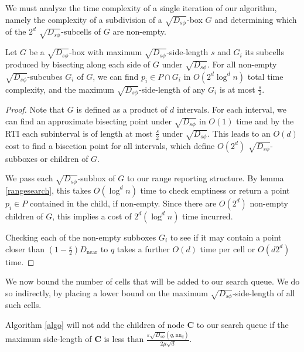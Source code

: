 \documentclass[11pt]{myclass}
\newcommand{\sbreg}{\ensuremath{D_{s\phi}}}
\newcommand{\eps}{\varepsilon}
\begin{document}
We must analyze the time complexity of a single iteration of our algorithm, namely the complexity of a subdivision of a $\sqrt{\sbreg}$-box $G$ and determining which of the $2^d$ $\sqrt{\sbreg}$-subcells of $G$ are non-empty.
\begin{lemma}\label{bisectionProcedure}
Let $G$ be a $\sqrt{\sbreg}$-box with maximum $\sqrt{\sbreg}$-side-length $s$ and $G_i$ its subcells produced by bisecting along each side of $G$ under $\sqrt{\sbreg}$. For all non-empty $\sqrt{\sbreg}$-subcubes $G_i$ of $G$, we can find $p_i \in P \cap G_i$ in $O(2^d \log^{d} n)$ total time complexity, and the maximum $\sqrt{\sbreg}$-side-length of any $G_i$ is at most $\frac{s}{2}$.
\end{lemma}

\begin{proof}
 Note that $G$ is defined as a product of $d$ intervals. For each interval, we can find an approximate bisecting point under
$\sqrt{\sbreg}$ in $O(1)$ time and by the RTI each subinterval is of length at most $\frac{s}{2}$ under $\sqrt{\sbreg}$. This leads to an $O(d)$ cost to find a bisection point for all intervals, which define $O(2^d)$ $\sqrt{\sbreg}$-subboxes or children of $G$.

We pass each $\sqrt{\sbreg}$-subbox of $G$ to our range reporting structure. By lemma \ref{rangesearch}, this takes $O(\log^{d} n)$ time to check emptiness or return a point $p_i \in P$ contained in the child, if non-empty. Since there are $O(2^d)$ non-empty children of $G$, this implies a cost of $2^d(\log^{d} n)$ time incurred.

 Checking each of the non-empty subboxes $G_i$ to see if it may contain a point closer than $(1 - \frac{\eps}{2}) D_{\text{near}}$ to $q$ takes a further $O(d)$ time per cell or $O(d 2^d)$ time. 
\end{proof}

We now bound the number of cells that will be added to our search queue. We do so indirectly, by placing a lower bound on the maximum $\sqrt{\sbreg}$-side-length of all such cells.


\begin{lemma}\label{depthCube}
Algorithm \ref{algo} will not add the children of node  $\textbf{C}$ to our search queue 
if the maximum side-length of $\textbf{C}$ is less than $\frac{\eps \sqrt{\sbreg}(q, \text{nn}_q)}{2 \mu \sqrt{d}}$.
\end{lemma}
\end{document}
